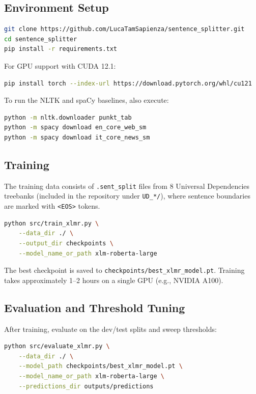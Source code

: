 \documentclass[11pt,a4paper]{article}
\begin{document}
\subsection{Environment Setup}

\begin{lstlisting}[language=bash]
git clone https://github.com/LucaTamSapienza/sentence_splitter.git
cd sentence_splitter
pip install -r requirements.txt
\end{lstlisting}

For GPU support with CUDA 12.1:

\begin{lstlisting}[language=bash]
pip install torch --index-url https://download.pytorch.org/whl/cu121
\end{lstlisting}

To run the NLTK and spaCy baselines, also execute:

\begin{lstlisting}[language=bash]
python -m nltk.downloader punkt_tab
python -m spacy download en_core_web_sm
python -m spacy download it_core_news_sm
\end{lstlisting}

\subsection{Training}

The training data consists of \texttt{.sent\_split} files from 8 Universal
Dependencies treebanks (included in the repository under \texttt{UD\_*/}), where
sentence boundaries are marked with \texttt{<EOS>} tokens.

\begin{lstlisting}[language=bash]
python src/train_xlmr.py \
    --data_dir ./ \
    --output_dir checkpoints \
    --model_name_or_path xlm-roberta-large
\end{lstlisting}

The best checkpoint is saved to \texttt{checkpoints/best\_xlmr\_model.pt}.
Training takes approximately 1--2 hours on a single GPU (e.g., NVIDIA A100).

\subsection{Evaluation and Threshold Tuning}

After training, evaluate on the dev/test splits and sweep thresholds:

\begin{lstlisting}[language=bash]
python src/evaluate_xlmr.py \
    --data_dir ./ \
    --model_path checkpoints/best_xlmr_model.pt \
    --model_name_or_path xlm-roberta-large \
    --predictions_dir outputs/predictions
\end{lstlisting}
\end{document}

